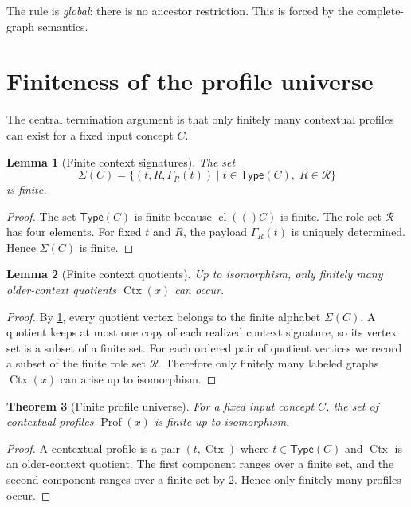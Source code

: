 \documentclass[11pt]{article}
\newtheorem{theorem}{Theorem}[section]
\newtheorem{lemma}[theorem]{Lemma}
\theoremstyle{definition}
\newcommand{\Roles}{\mathcal{R}}
\newcommand{\cl}[1]{\operatorname{cl}(#1)}
\newcommand{\Prof}{\operatorname{Prof}}
\newcommand{\Ctx}{\operatorname{Ctx}}
\begin{document}
The rule is \emph{global}: there is no ancestor restriction. This is forced by the complete-graph semantics.

\section{Finiteness of the profile universe}

The central termination argument is that only finitely many contextual profiles can exist for a fixed input concept $C$.

\begin{lemma}[Finite context signatures]\label{lem:finitectxsig}
The set
\[
\Sigma(C)=\{(t,R,\Gamma_R(t))\mid t\in\mathsf{Type}(C),\;R\in\Roles\}
\]
is finite.
\end{lemma}

\begin{proof}
The set $\mathsf{Type}(C)$ is finite because $\cl(C)$ is finite. The role set $\Roles$ has four elements. For fixed $t$ and $R$, the payload $\Gamma_R(t)$ is uniquely determined. Hence $\Sigma(C)$ is finite.
\end{proof}

\begin{lemma}[Finite context quotients]\label{lem:finitectx}
Up to isomorphism, only finitely many older-context quotients $\Ctx(x)$ can occur.
\end{lemma}

\begin{proof}
By \cref{lem:finitectxsig}, every quotient vertex belongs to the finite alphabet $\Sigma(C)$. A quotient keeps at most one copy of each realized context signature, so its vertex set is a subset of a finite set. For each ordered pair of quotient vertices we record a subset of the finite role set $\Roles$. Therefore only finitely many labeled graphs $\Ctx(x)$ can arise up to isomorphism.
\end{proof}

\begin{theorem}[Finite profile universe]\label{thm:finiteprofiles}
For a fixed input concept $C$, the set of contextual profiles $\Prof(x)$ is finite up to isomorphism.
\end{theorem}

\begin{proof}
A contextual profile is a pair $(t,\Ctx)$ where $t\in\mathsf{Type}(C)$ and $\Ctx$ is an older-context quotient. The first component ranges over a finite set, and the second component ranges over a finite set by \cref{lem:finitectx}. Hence only finitely many profiles occur.
\end{proof}
\end{document}
